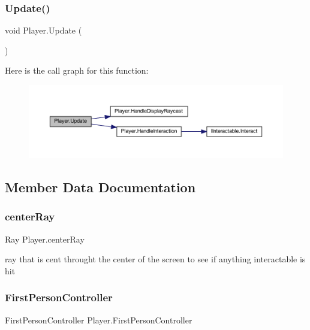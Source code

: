 \subsubsection{\texorpdfstring{Update()}{Update()}}
{\footnotesize\ttfamily void Player.\+Update (\begin{DoxyParamCaption}{ }\end{DoxyParamCaption})\hspace{0.3cm}{\ttfamily [private]}}

Here is the call graph for this function\+:\nopagebreak
\begin{figure}[H]
\begin{center}
\leavevmode
\includegraphics[width=350pt]{class_player_aace80372e18e32fe177e295fe5d93ba8_cgraph}
\end{center}
\end{figure}


\subsection{Member Data Documentation}
\mbox{\label{class_player_ae2a4edadae1e278ef28c3bb236e7af83}} 
\subsubsection{\texorpdfstring{center\+Ray}{centerRay}}
{\footnotesize\ttfamily Ray Player.\+center\+Ray\hspace{0.3cm}{\ttfamily [private]}}



ray that is cent throught the center of the screen to see if anything interactable is hit 

\mbox{\label{class_player_a2b1dcb2e1f53c780a7501dbc6f89a174}} 
\subsubsection{\texorpdfstring{First\+Person\+Controller}{FirstPersonController}}
{\footnotesize\ttfamily First\+Person\+Controller Player.\+First\+Person\+Controller}



